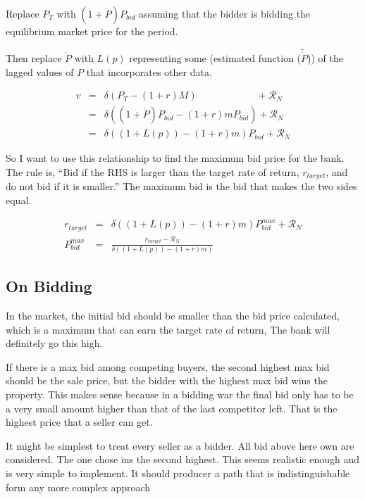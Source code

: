 Replace $P_T$ with $(1+\dot P)P_{bid}$ assuming that the bidder is bidding the equilibrium market price for the period.

Then replace   $\dot P$ with $L(p)$ representing some (estimated function ($\tilde{\dot P}$)) of the lagged values of $P$ that incorporates other data. 

\begin{eqnarray}
v&=& \delta(P_T- (1+r)M) \qquad \qquad \qquad 	 + \mathcal{R}_N \nonumber\\
 &=&\delta\left( (1+\dot P)P_{bid} - (1+r)mP_{bid} \right)  + \mathcal{R}_N  \nonumber\\
  &=&\delta\left( (1+L(p)) - (1+r)m \right) P_{bid} + \mathcal{R}_N  \nonumber
\end{eqnarray}

So I want to use this relationship to find the maximum bid price for the bank. The rule is, ``Bid if the RHS is larger than the target rate of return, $r_{target}$, and do not bid if it is smaller.''  The maximum bid  is the bid that makes the two sides equal. 

{\color{red}
\begin{eqnarray}
r_{target}&=& \delta\left( (1+L(p)) - (1+r)m \right) P^{max}_{bid} + \mathcal{R}_N  \nonumber\\
   P^{max}_{bid} &=&\frac{r_{target}-\mathcal{R}_N}{\delta\left( (1+L(p)) - (1+r)m \right)} \label{EqBidPrice} 
\end{eqnarray}}
\newpage


\subsection{On Bidding}
In the market, the initial bid should be smaller than the bid price calculated, which is a maximum that can earn the target rate of return, The bank will definitely go this high. 

If there is a  max bid among competing buyers, the second highest max bid should be the sale price, but the bidder with the highest max bid wins the property. This makes sense because in a bidding war the final bid only has to be a very small amount higher than that of the last competitor left.
That is the highest price that a seller can get.

It might be simplest to treat every seller as a bidder. All bid above here own are considered. The one chose ins the second highest. This  seems realistic enough and is very simple to implement. It should producer a path that is indistinguishable form any more complex approach

